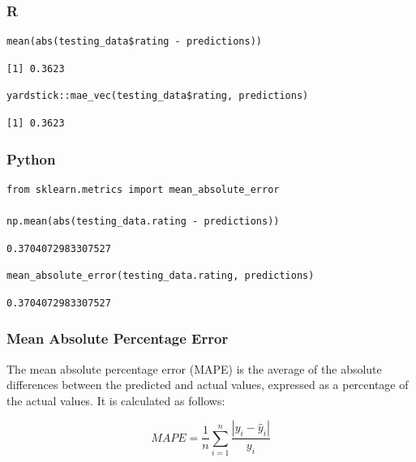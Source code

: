 \documentclass[
  letterpaper,
]{krantz}
\begin{document}
\subsubsection{R}

\begin{verbatim}
mean(abs(testing_data$rating - predictions))
\end{verbatim}

\begin{verbatim}
[1] 0.3623
\end{verbatim}

\begin{verbatim}
yardstick::mae_vec(testing_data$rating, predictions)
\end{verbatim}

\begin{verbatim}
[1] 0.3623
\end{verbatim}

\subsubsection{Python}

\begin{verbatim}
from sklearn.metrics import mean_absolute_error

np.mean(abs(testing_data.rating - predictions))
\end{verbatim}

\begin{verbatim}
0.3704072983307527
\end{verbatim}

\begin{verbatim}
mean_absolute_error(testing_data.rating, predictions)
\end{verbatim}

\begin{verbatim}
0.3704072983307527
\end{verbatim}

\subsubsection{Mean Absolute Percentage
Error}\label{sec-knowing-metrics-mape}

The mean absolute percentage error (MAPE) is the average of the absolute
differences between the predicted and actual values, expressed as a
percentage of the actual values. It is calculated as follows:

\[MAPE = \frac{1}{n}\sum_{i=1}^{n}\frac{|y_i - \hat{y}_i|}{y_i}\]
\end{document}
